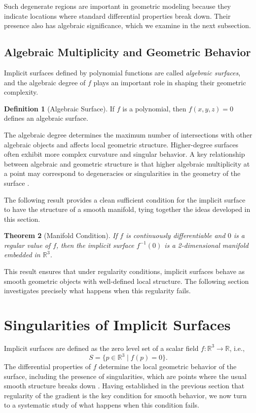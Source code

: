 \documentclass[12pt, a4paper, oneside]{book}
\theoremstyle{plain}
\newtheorem{theorem}{Theorem}[chapter]
\theoremstyle{definition}
\newtheorem{definition}[theorem]{Definition}
\theoremstyle{remark}
\theoremstyle{definition}
\begin{document}
Such degenerate regions are important in geometric modeling because they indicate locations where standard differential properties break down. Their presence also has algebraic significance, which we examine in the next subsection.

\subsection{Algebraic Multiplicity and Geometric Behavior}

Implicit surfaces defined by polynomial functions are called \emph{algebraic surfaces},
and the algebraic degree of $f$ plays an important role in shaping their geometric
complexity.

\begin{definition}[Algebraic Surface]
If $f$ is a polynomial, then $f(x,y,z)=0$ defines an algebraic surface.
\end{definition}

The algebraic degree determines the maximum number of intersections with other algebraic
objects and affects local geometric structure. Higher-degree surfaces often exhibit more
complex curvature and singular behavior. A key relationship between algebraic and
geometric structure is that higher algebraic multiplicity at a point may correspond to
degeneracies or singularities in the geometry of the surface \cite{bloomenthal2000implicit}.

The following result provides a clean sufficient condition for the implicit surface to
have the structure of a smooth manifold, tying together the ideas developed in this
section.

\begin{theorem}[Manifold Condition]
If $f$ is continuously differentiable and $0$ is a regular value of $f$, then the
implicit surface $f^{-1}(0)$ is a 2-dimensional manifold embedded in $\mathbb{R}^3$.
\end{theorem}

This result ensures that under regularity conditions, implicit surfaces behave as smooth
geometric objects with well-defined local structure. The following section investigates
precisely what happens when this regularity fails.

\section{Singularities of Implicit Surfaces}
\label{sec:singularities}

Implicit surfaces are defined as the zero level set of a scalar field
$f:\mathbb{R}^3 \rightarrow \mathbb{R}$, i.e.,
\[
S = \{ p \in \mathbb{R}^3 \mid f(p) = 0 \}.
\]
The differential properties of $f$ determine the local geometric behavior of the surface, including the presence of singularities, which are points where the usual smooth structure breaks down \cite{bloomenthal2000implicit}. Having established in the previous section that regularity of the gradient is the key condition for smooth behavior, we now turn to a systematic study of what happens when this condition fails.
\end{document}
